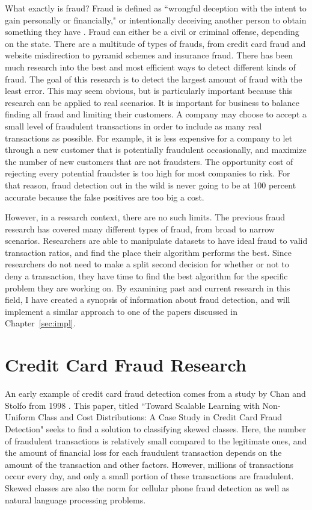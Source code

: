 \documentclass[midd]{thesis}
\begin{document}
What exactly is fraud? Fraud is defined as ``wrongful deception with the intent to gain personally or financially," or intentionally deceiving another person to obtain something they have \cite{legaldict}. Fraud can either be a civil or criminal offense, depending on the state. There are a multitude of types of frauds, from credit card fraud and website misdirection to pyramid schemes and insurance fraud. There has been much research into the best and most efficient ways to detect different kinds of fraud. The goal of this research is to detect the largest amount of fraud with the least error. This may seem obvious, but is particularly important because this research can be applied to real scenarios. It is important for business to balance finding all fraud and limiting their customers. A company may choose to accept a small level of fraudulent transactions in order to include as many real transactions as possible. For example, it is less expensive for a company to let through a new customer that is potentially fraudulent  occasionally, and maximize the number of new customers that are not fraudsters. The opportunity cost of rejecting every potential fraudster is too high for most companies to risk. For that reason, fraud detection out in the wild is never going to be at 100 percent accurate because the false positives are too big a cost.

However, in a research context, there are no such limits. The previous fraud research has covered many different types of fraud, from broad to narrow scenarios. Researchers are able to manipulate datasets to have ideal fraud to valid transaction ratios, and find the place their algorithm performs the best. Since researchers do not need to make a split second decision for whether or not to deny a transaction, they have time to find the best algorithm for the specific problem they are working on. By examining past and current research in this field, I have created a synopsis of information about fraud detection, and will implement a similar approach to one of the papers discussed in Chapter~\ref{sec:impl}. 


\section{Credit Card Fraud Research}

An early example of credit card fraud detection comes from a study by Chan and Stolfo from 1998 \cite{Chan}. This paper, titled ``Toward Scalable Learning with Non-Uniform Class and Cost Distributions: A Case Study in Credit Card Fraud Detection" seeks to find a solution to classifying skewed classes. Here, the number of fraudulent transactions is relatively small compared to the legitimate ones, and the amount of financial loss for each fraudulent transaction depends on the amount of the transaction and other factors. However, millions of transactions occur every day, and only a small portion of these transactions are fraudulent. Skewed classes are also the norm for cellular phone fraud detection as well as natural language processing problems.
\end{document}
